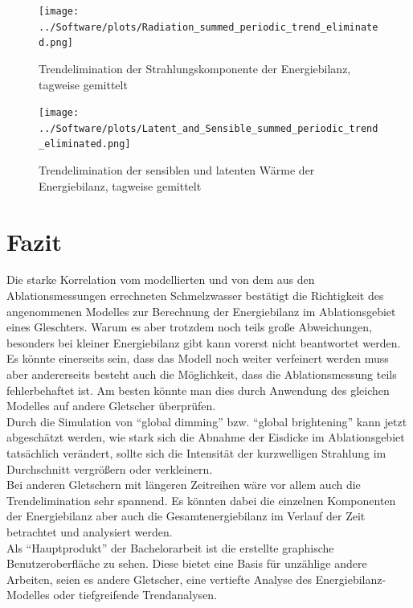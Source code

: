 \documentclass[12pt,a4paper]{article}
\begin{document}
\begin{figure}[H]
\centering
\texttt{[image: ../Software/plots/Radiation\_summed\_periodic\_trend\_eliminated.png]}
\caption{Trendelimination der Strahlungskomponente der Energiebilanz, tagweise gemittelt}
\label{fig:Trendelimination der Strahlungskomponente der Energiebilanz}
\end{figure}

\begin{figure}[H]
\centering
\texttt{[image: ../Software/plots/Latent\_and\_Sensible\_summed\_periodic\_trend\_eliminated.png]}
\caption{Trendelimination der sensiblen und latenten Wärme der Energiebilanz, tagweise gemittelt}
\label{fig:Trendelimination der sensiblen und latenten Wärme der Energiebilanz}
\end{figure}


\pagebreak
\section{Fazit}
Die starke Korrelation vom modellierten und von dem aus den Ablationsmessungen errechneten Schmelzwasser bestätigt die Richtigkeit des angenommenen Modelles zur Berechnung der Energiebilanz im Ablationsgebiet eines Gleschters. Warum es aber trotzdem noch teils große Abweichungen, besonders bei kleiner Energiebilanz gibt kann vorerst nicht beantwortet werden. Es könnte einerseits sein, dass das Modell noch weiter verfeinert werden muss aber andererseits besteht auch die Möglichkeit, dass die Ablationsmessung teils fehlerbehaftet ist. Am besten könnte man dies durch Anwendung des gleichen Modelles auf andere Gletscher überprüfen.\\

Durch die Simulation von ``global dimming'' bzw. ``global brightening'' kann jetzt abgeschätzt werden, wie stark sich die Abnahme der Eisdicke im Ablationsgebiet tatsächlich verändert, sollte sich die Intensität der kurzwelligen Strahlung im Durchschnitt vergrößern oder verkleinern. \\

Bei anderen Gletschern mit längeren Zeitreihen wäre vor allem auch die Trendelimination sehr spannend. Es könnten dabei die einzelnen Komponenten der Energiebilanz aber auch die Gesamtenergiebilanz im Verlauf der Zeit betrachtet und analysiert werden.\\

Als ``Hauptprodukt'' der Bachelorarbeit ist die erstellte graphische Benutzeroberfläche zu sehen. Diese bietet eine Basis für unzählige andere Arbeiten, seien es andere Gletscher, eine vertiefte Analyse des Energiebilanz-Modelles oder tiefgreifende Trendanalysen.  
\end{document}
